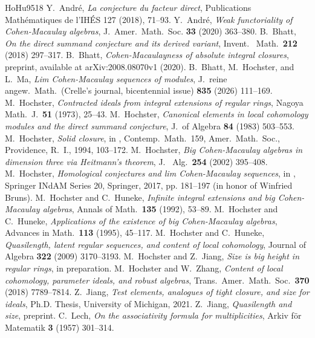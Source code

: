 \documentclass[12pt]{amsart}
\theoremstyle{plain}
\theoremstyle{remark}
\theoremstyle{definition}
\numberwithin{equation}{theorem}
\begin{document}
\begin{thebibliography}{HoHu9518}
 Y.~Andr\'e, \emph{La conjecture du facteur direct}, Publications Math\'ematiques
de l'IH\'ES 127 (2018), 71--93.
 Y.~Andr\'e, \emph{Weak functoriality of Cohen-Macaulay algebras}, J.~Amer.~Math.~Soc. {\bf 33} (2020) 363--380.
  B.~Bhatt, \emph{On the direct summand conjecture and its derived variant},
Invent.~ Math.~{\bf 212} (2018) 297--317.
 B.~Bhatt, \emph{Cohen-Macaulayness of absolute integral closures}, preprint, available at  arXiv:2008.08070v1 (2020). 
 B.~Bhatt, M.~Hochster, and L.~Ma, \emph{Lim Cohen-Macaulay sequences of modules}, 
J.~reine angew.~Math.~(Crelle's journal, bicentennial issue) {\bf 835} (2026) 111--169.
 M.~Hochster, \emph{Contracted ideals from integral extensions of regular rings}, Nagoya Math.~J.~{\bf 51} (1973), 25--43. 
 M.~Hochster, \emph{Canonical elements in local cohomology modules and the 
direct summand conjecture}, J.~of Algebra {\bf 84} (1983) 503--553.
 M.~Hochster, \emph{Solid closure}, in  , Contemp.~Math.~159, Amer.~Math.~Soc., Providence, R.~I., 1994, 103--172.
 M.~Hochster, \emph{Big Cohen-Macaulay algebras in 
dimension three via Heitmann's theorem}, 
J.~ Alg.~{\bf 254} (2002) 395--408.
 M.~Hochster, \emph{Homological conjectures and lim Cohen-Macaulay sequences}, in , Springer INdAM Series 20, Springer, 2017, pp. 181--197 (in honor of Winfried Bruns). 
 M.~Hochster and C.~Huneke, \emph{Infinite integral extensions and big Cohen-Macaulay algebras}, Annals of Math.~{\bf 135} (1992), 53--89.
 M.~Hochster and C.~Huneke, \emph{Applications of the existence of big Cohen-Macaulay algebras}, Advances in Math.~{\bf 113} (1995), 45--117.
 M.~Hochster and C.~Huneke, \emph{Quasilength, latent regular sequences, and content of local cohomology}, Journal of Algebra {\bf322} (2009) 3170--3193.
 M.~Hochster and Z.~Jiang, \emph{Size is big height in regular rings}, in preparation. 
 M.~Hochster and W.~Zhang, \emph{Content of local cohomology, parameter ideals, and robust algebras},  Trans.~Amer.~Math.~Soc.~{\bf 370} (2018) 7789--7814.
 Z.~Jiang, \emph{Test elements, analogues of tight closure, and size for ideals},
Ph.D. Thesis, University of Michigan, 2021.
 Z.~Jiang, \emph{Quasilength and size}, preprint.
 C.~Lech, \emph{On the associativity formula for multiplicities}, 
Arkiv f\"or Matematik {\bf 3} (1957) 301--314.

\end{thebibliography}
\end{document}
